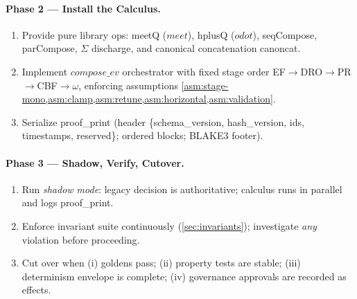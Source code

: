 \documentclass[11pt]{article}
\theoremstyle{plain}
\theoremstyle{definition}
\theoremstyle{remark}
\def\Sig{\Sigma}%
\def\composeev{compose\_ev}%
\def\vmeet{meet}%
\def\hplus{odot}%
\def\code#1{#1}%
\DeclareRobustCommand{\Sig}{\texorpdfstring{\ensuremath{\Sigma}}{\Sigma}}   %
\DeclareMathOperator{\composeevOp}{compose\_ev}
\DeclareRobustCommand{\composeev}{\texorpdfstring{\ensuremath{\composeevOp}}{compose\_ev}}
\newcommand{\vmeet}{\wedge}                    %
\newcommand{\hplus}{\odot}                     %
\newcommand{\code}[1]{\texttt{\textup{#1}}}    %
\newcommand{\EF}{\textsc{EF}}
\newcommand{\DRO}{\textsc{DRO}}
\newcommand{\PR}{\textsc{PR}}
\newcommand{\CBF}{\textsc{CBF}}
\newcommand{\om}{\ensuremath{\omega}}
\def\Sig{\Sigma}%
\def\composeev{compose\_ev}%
\def\vmeet{meet}%
\def\hplus{odot}%
\def\code#1{#1}%
\begin{document}
\paragraph{Phase 2 — Install the Calculus.}
\begin{enumerate}[leftmargin=2em,label=(P2.\arabic*)]
  \item Provide pure library ops: \code{meetQ} ($\vmeet$), \code{hplusQ} ($\hplus$), \code{seqCompose}, \code{parCompose}, $\Sig$ discharge, and canonical concatenation \code{canoncat}.
  \item Implement $\composeev$ orchestrator with fixed stage order \EF$\!\to$\DRO$\!\to$\PR$\!\to$\CBF$\!\to$\om{}, enforcing assumptions \cref{asm:stage-mono,asm:clamp,asm:retune,asm:horizontal,asm:validation}.
  \item Serialize \code{proof\_print} (header \{\code{schema\_version}, \code{hash\_version}, ids, timestamps, reserved\}; ordered blocks; BLAKE3 footer).
\end{enumerate}

\paragraph{Phase 3 — Shadow, Verify, Cutover.}
\begin{enumerate}[leftmargin=2em,label=(P3.\arabic*)]
  \item Run \emph{shadow mode}: legacy decision is authoritative; calculus runs in parallel and logs \code{proof\_print}.
  \item Enforce invariant suite continuously (\cref{sec:invariants}); investigate \emph{any} violation before proceeding.
  \item Cut over when (i) goldens pass; (ii) property tests are stable; (iii) determinism envelope is complete; (iv) governance approvals are recorded as \Sig{} effects.
\end{enumerate}
\end{document}
